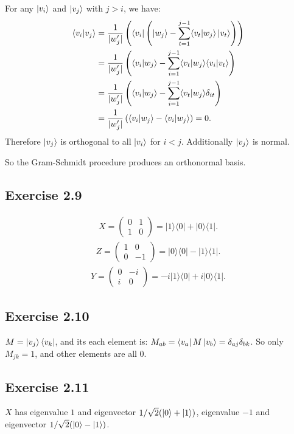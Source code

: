 For any $\ket{v_i}$ and $\ket{v_j}$ with $j>i$, we have: 
\begin{align}
         \langle v_i|v_j\rangle&=\frac{1}{|w_j'|}\left(\langle v_i|\left(|w_j\rangle -\sum_{t=1}^{j-1}\langle v_t|w_j\rangle\ket{v_t}\right)\right)\\
         &=\frac{1}{|w_j'|}\left(\langle v_i|w_j\rangle -\sum_{i=1}^{j-1}\langle v_t|w_j\rangle\langle v_i|v_t\rangle\right)\\
         &=\frac{1}{|w_j'|}\left(\langle v_i|w_j\rangle -\sum_{i=1}^{j-1}\langle v_t|w_j\rangle\delta_{it}\right)\\
         &=\frac{1}{|w_j'|}\left(\langle v_i|w_j\rangle -\langle v_i|w_j\rangle\right)=0.
         \end{align}
Therefore $\ket{v_j}$ is orthogonal to all $\ket{v_i}$ for $i<j$. Additionally $\ket{v_j}$ is normal.

So the Gram-Schmidt procedure produces an orthonormal basis.

\subsection*{Exercise 2.9}
\begin{align}
X=\begin{pmatrix}0&1\\1&0\end{pmatrix}=|1\rangle\langle 0|+|0\rangle\langle 1|.
\end{align}
\begin{align}
Z=\begin{pmatrix}1&0\\0&-1\end{pmatrix}=|0\rangle\langle 0|-|1\rangle\langle 1|.
         \end{align}
     \begin{align}
Y=\begin{pmatrix}0&-i\\i&0\end{pmatrix}=-i|1\rangle\langle 0|+i|0\rangle\langle 1|.
         \end{align}
     
\subsection*{Exercise 2.10}
$M=\ket{v_j}\bra{v_k}$, and its each element is: $M_{ab}=\bra{v_a}M\ket{v_b}=\delta_{aj}\delta_{bk}$. So only $M_{jk}=1$, and other elements are all $0$.

\subsection*{Exercise 2.11}
$X$ has eigenvalue $1$ and eigenvector $1/\sqrt 2(\ket{0}+\ket{1})$, eigenvalue $-1$ and eigenvector $1/\sqrt 2(\ket{0}-\ket{1})$.

